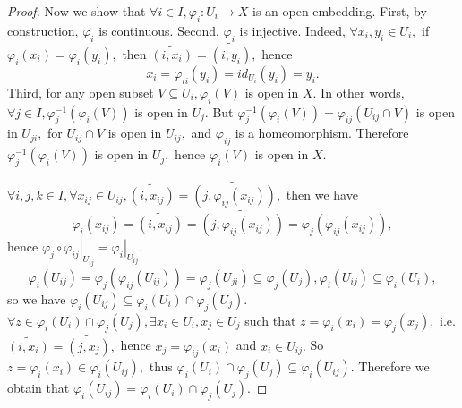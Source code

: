 \begin{proof}
Now we show that $\forall i\in I, \varphi_i: U_i\rightarrow X$ is an
open embedding. First, by construction, $\varphi_i$ is continuous.
Second, $\varphi_i$ is injective. Indeed, $\forall x_i, y_i\in U_i,$
if $\varphi_i(x_i)=\varphi_i(y_i),$ then
$\widetilde{(i,x_i)}=\widetilde{(i,y_i)},$ hence
$$x_i=\varphi_{ii}(y_i)=id_{U_i}(y_i)=y_i.$$ Third, for any open
subset $V\subseteq U_i, \varphi_i(V)$ is open in $X.$ In other
words, $\forall j\in I, \varphi^{-1}_j(\varphi_i(V))$ is open in
$U_j.$ But $\varphi^{-1}_j(\varphi_i(V))=\varphi_{ij}(U_{ij}\cap V)$
is open in $U_{ji},$ for $U_{ij}\cap V$ is open in $U_{ij},$ and
$\varphi_{ij}$ is a homeomorphism. Therefore
$\varphi^{-1}_j(\varphi_i(V))$ is open in $U_j,$ hence
$\varphi_i(V)$ is open in $X.$

$\forall i,j,k\in I, \forall x_{ij}\in U_{ij},
\widetilde{(i,x_{ij})}=\widetilde{(j,\varphi_{ij}(x_{ij}))},$ then
we have$$\varphi_i(x_{ij})=\widetilde{(i,x_{ij})}=
\widetilde{(j,\varphi_{ij}(x_{ij}))}=\varphi_j(\varphi_{ij}(x_{ij})),$$hence
$\left.\varphi_j\circ\varphi_{ij}\right|_{U_{ij}} =
\left.\varphi_i\right|_{U_{ij}}.$
$$\varphi_i(U_{ij})=\varphi_j(\varphi_{ij}(U_{ij}))=\varphi_j(U_{ji})\subseteq \varphi_j(U_j),
\varphi_i(U_{ij})\subseteq\varphi_i(U_i),$$ so we have
$\varphi_i(U_{ij})\subseteq\varphi_i(U_i)\cap\varphi_j(U_j).$
$\forall z\in\varphi_i(U_i)\cap\varphi_j(U_j), \exists x_i\in U_i,
x_j\in U_j$ such that $z=\varphi_i(x_i)=\varphi_j(x_j),$ i.e.
$\widetilde{(i,x_i)}=\widetilde{(j,x_j)},$ hence
$x_j=\varphi_{ij}(x_i)$ and $x_i\in U_{ij}.$ So $z=\varphi_i(x_i)\in
\varphi_i(U_{ij}),$ thus
$\varphi_i(U_i)\cap\varphi_j(U_j)\subseteq\varphi_i(U_{ij}).$
Therefore we obtain that
$\varphi_i(U_{ij})=\varphi_i(U_i)\cap\varphi_j(U_j).$


\end{proof}
